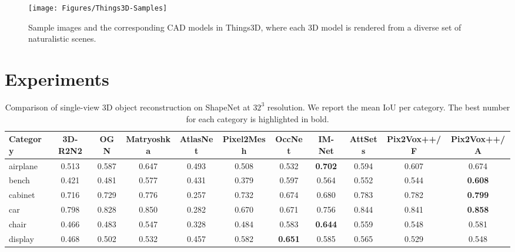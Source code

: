\documentclass[twocolumn]{svjour3}
\begin{document}
\begin{figure}[!t]
  \centering
  \resizebox{\linewidth}{!} {
    \texttt{[image: Figures/Things3D-Samples]}
  }
  \caption{Sample images and the corresponding CAD models in Things3D, where each 3D model is rendered from a diverse set of naturalistic scenes.}
  \label{fig:Things3D-samples}
\end{figure}

\section{Experiments}

\begin{table*}[!t]
  \caption{Comparison of single-view 3D object reconstruction on ShapeNet at $32^3$ resolution. We report the mean IoU per category. The best number for each category is highlighted in bold.}
  \resizebox{\linewidth}{!} {
    \begin{tabular}{lcccccccccc}
      \toprule
      Category     & 3D-R2N2    & OGN        & Matryoshka
                   & AtlasNet   & Pixel2Mesh & OccNet
                   & IM-Net     & AttSets    
                   & Pix2Vox++/F& Pix2Vox++/A \\
      \midrule
      airplane     & 0.513      & 0.587      & 0.647
                   & 0.493      & 0.508      & 0.532
                   & \bf{0.702} & 0.594
                   & 0.607      & 0.674 \\
      bench        & 0.421      & 0.481      & 0.577
                   & 0.431      & 0.379      & 0.597
                   & 0.564      & 0.552
                   & 0.544      & \bf{0.608} \\
      cabinet      & 0.716      & 0.729      & 0.776
                   & 0.257      & 0.732      & 0.674
                   & 0.680      & 0.783
                   & 0.782      & \bf{0.799} \\
      car          & 0.798      & 0.828      & 0.850
                   & 0.282      & 0.670      & 0.671
                   & 0.756      & 0.844
                   & 0.841      & \bf{0.858} \\
      chair        & 0.466      & 0.483      & 0.547
                   & 0.328      & 0.484      & 0.583
                   & \bf{0.644} & 0.559
                   & 0.548      & 0.581 \\
      display      & 0.468      & 0.502      & 0.532
                   & 0.457      & 0.582      & \bf{0.651}
                   & 0.585      & 0.565
                   & 0.529      & 0.548 \\

\end{tabular}}
\end{table*}
\end{document}
